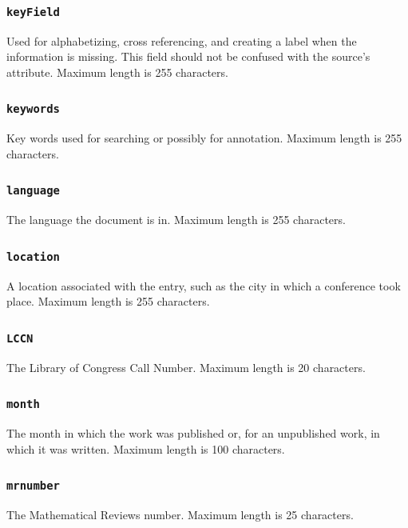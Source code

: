 \documentclass[letterpaper,10pt,english]{sphinxmanual}
\begin{document}
\subsubsection{\texttt{keyField}}
\label{datastructure:keyfield}
Used for alphabetizing, cross referencing, and creating a label when the
 information is missing. This field should not be confused with the
source's  attribute.  Maximum length is 255 characters.


\subsubsection{\texttt{keywords}}
\label{datastructure:keywords}
Key words used for searching or possibly for annotation.  Maximum length is 255
characters.


\subsubsection{\texttt{language}}
\label{datastructure:id43}
The language the document is in.  Maximum length is 255 characters.


\subsubsection{\texttt{location}}
\label{datastructure:location}
A location associated with the entry, such as the city in which a conference
took place.  Maximum length is 255 characters.


\subsubsection{\texttt{LCCN}}
\label{datastructure:lccn}
The Library of Congress Call Number.  Maximum length is 20 characters.


\subsubsection{\texttt{month}}
\label{datastructure:month}
The month in which the work was published or, for an unpublished work, in which
it was written.  Maximum length is 100 characters.


\subsubsection{\texttt{mrnumber}}
\label{datastructure:mrnumber}
The Mathematical Reviews number.  Maximum length is 25 characters.
\end{document}
